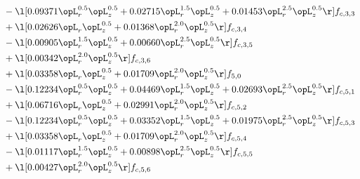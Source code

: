 \begin{alignat}{2}
& - \l[  0.09371 \opL_r^{0.5} \opL_z^{0.5} +  0.02715 \opL_r^{1.5} \opL_z^{0.5} +  0.01453 \opL_r^{2.5} \opL_z^{0.5}  \r] f_{c,3,3} \nonumber \\ 
& + \l[  0.02626 \opL_r \opL_z^{0.5} +  0.01368 \opL_r^{2.0} \opL_z^{0.5}  \r] f_{c,3,4} \nonumber \\ 
& - \l[  0.00905 \opL_r^{1.5} \opL_z^{0.5} +  0.00660 \opL_r^{2.5} \opL_z^{0.5}  \r] f_{c,3,5} \nonumber \\ 
& + \l[  0.00342 \opL_r^{2.0} \opL_z^{0.5}  \r] f_{c,3,6} \nonumber \\ 
& + \l[  0.03358 \opL_r \opL_z^{0.5} +  0.01709 \opL_r^{2.0} \opL_z^{0.5}  \r] f_{5,0} \nonumber \\ 
& - \l[  0.12234 \opL_r^{0.5} \opL_z^{0.5} +  0.04469 \opL_r^{1.5} \opL_z^{0.5} +  0.02693 \opL_r^{2.5} \opL_z^{0.5}  \r] f_{c,5,1} \nonumber \\ 
& + \l[  0.06716 \opL_r \opL_z^{0.5} +  0.02991 \opL_r^{2.0} \opL_z^{0.5}  \r] f_{c,5,2} \nonumber \\ 
& - \l[  0.12234 \opL_r^{0.5} \opL_z^{0.5} +  0.03352 \opL_r^{1.5} \opL_z^{0.5} +  0.01975 \opL_r^{2.5} \opL_z^{0.5}  \r] f_{c,5,3} \nonumber \\ 
& + \l[  0.03358 \opL_r \opL_z^{0.5} +  0.01709 \opL_r^{2.0} \opL_z^{0.5}  \r] f_{c,5,4} \nonumber \\ 
& - \l[  0.01117 \opL_r^{1.5} \opL_z^{0.5} +  0.00898 \opL_r^{2.5} \opL_z^{0.5}  \r] f_{c,5,5} \nonumber \\ 
& + \l[  0.00427 \opL_r^{2.0} \opL_z^{0.5}  \r] f_{c,5,6} \nonumber \\ 
\end{alignat} 


